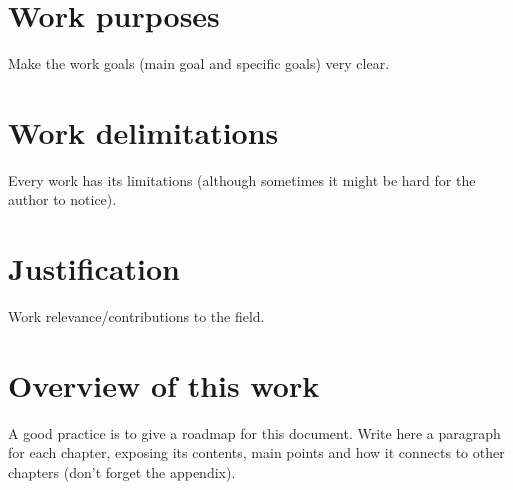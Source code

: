 \section{Work purposes}
\label{section:work_purposes}
Make the work goals (main goal and specific goals) very clear.

\section{Work delimitations}
\label{section:work_limitations}
Every work has its limitations (although sometimes it might be hard for the author to notice).

\section{Justification}
Work relevance/contributions to the field.

\section{Overview of this work}
A good practice is to give a roadmap for this document. Write here a paragraph for each chapter, exposing its contents, main points and how it connects to other chapters (don't forget the appendix).